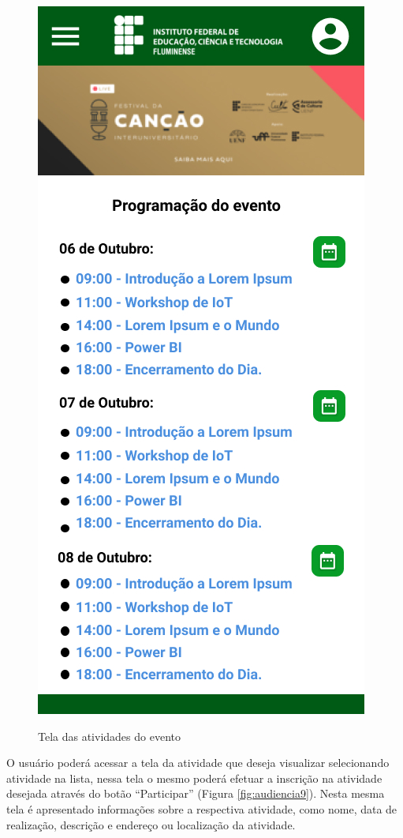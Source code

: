 \begin{figure}[H]
    \centering
    \caption{Tela das atividades do evento}
    \includegraphics[scale=0.44]{figuras/Audiencia/8-ListaAtividades.jpg}
    \label{fig:audiencia8}
\end{figure}

O usuário poderá acessar a tela da atividade que deseja visualizar selecionando atividade na lista, nessa tela o mesmo poderá efetuar a inscrição na atividade desejada através do botão “Participar” (Figura \ref{fig:audiencia9}). Nesta mesma tela é apresentado informações sobre a respectiva atividade, como nome, data de realização, descrição e endereço ou localização da atividade.

